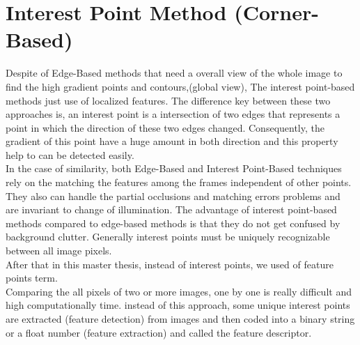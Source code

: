 \section{Interest Point Method (Corner-Based)}
Despite of Edge-Based methods that need a overall view of the whole image to find the high gradient points and contours,(global view), The interest point-based methods just use of localized features. The difference key between these two approaches is, an interest point is a intersection of two edges that represents a point in which the direction of these two edges changed. Consequently, the gradient of this point have a huge amount in both direction and this property help to can be detected easily.\\
In the case of similarity, both Edge-Based and Interest Point-Based techniques rely on the matching the features among the frames independent of other points. They also can handle the partial occlusions and matching errors problems and are invariant to change of illumination. The advantage of interest point-based methods compared to edge-based methods is that they do not get confused by background clutter. Generally interest points must be uniquely recognizable between all image pixels.\\
After that in this master thesis, instead of interest points, we used of feature points term.\\
Comparing the all pixels of two or more images, one by one is really difficult and high computationally time. instead of this approach, some unique interest points are extracted (feature detection) from images and then coded into a binary string or a float number (feature extraction) and called the feature descriptor.\\

